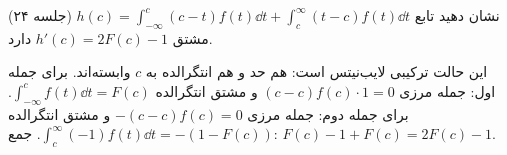 \begin{exercise}
نشان دهید تابع $h(c)=\int_{-\infty}^c(c-t)f(t)\dd t+\int_c^\infty(t-c)f(t)\dd t$ (جلسه ۲۴) مشتق $h'(c)=2F(c)-1$ دارد.
\end{exercise}
\begin{solution}
این حالت ترکیبی لایب‌نیتس است: هم حد و هم انتگرالده به $c$ وابسته‌اند. برای جمله اول: جمله مرزی $(c-c)f(c)\cdot1=0$ و مشتق انتگرالده $\int_{-\infty}^cf(t)\dd t=F(c)$. برای جمله دوم: جمله مرزی $-(c-c)f(c)=0$ و مشتق انتگرالده $\int_c^\infty(-1)f(t)\dd t=-(1-F(c))$. جمع: $F(c)-1+F(c)=2F(c)-1$.
\end{solution}

